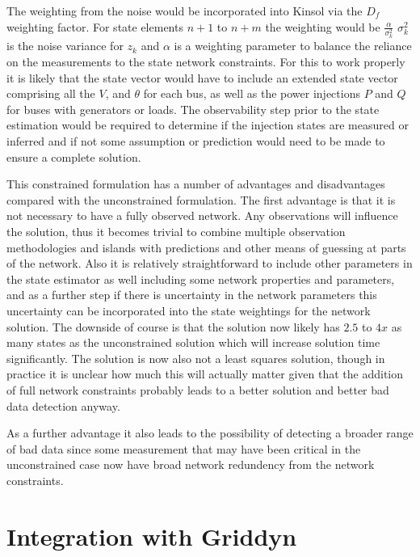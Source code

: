 \documentclass[11pt]{article} %
\begin{document}
The weighting from the noise would be incorporated into Kinsol via the $D_f$ weighting factor.  For state elements $n+1$ to $n+m$ the weighting would be $\frac{\alpha}{\sigma_k^2}$  $\sigma_k^2$ is the noise variance for $z_k$ and $\alpha$ is a weighting parameter to balance the reliance on the measurements to the state network constraints.  For this to work properly it is likely that the state vector would have to include an extended state vector comprising all the $V$, and $\theta$ for each bus,  as well as the power injections $P$ and $Q$ for buses with generators or loads.  The observability step prior to the state estimation would be required to determine if the injection states are measured or inferred and if not some assumption or prediction would need to be made to ensure a complete solution.

This constrained formulation has a number of advantages and disadvantages compared with the unconstrained formulation.  The first advantage is that it is not necessary to have a fully observed network.  Any observations will influence the solution, thus it becomes trivial to combine multiple observation methodologies and islands with predictions and other means of guessing at parts of the network.  Also it is relatively straightforward to include other parameters in the state estimator as well including some network properties and parameters, and as a further step if there is uncertainty in the network parameters this uncertainty can be incorporated into the state weightings for the network solution.  The downside of course is that the solution now likely has $2.5$ to $4x$ as many states as the unconstrained solution which will increase solution time significantly.  The solution is now also not a least squares solution,  though in practice it is unclear how much this will actually matter given that the addition of full network constraints probably leads to a better solution and better bad data detection anyway.

As a further advantage it also leads to the possibility of detecting a broader range of bad data since some measurement that may have been critical in the unconstrained case now have broad network redundency from the network constraints.

\section{Integration with Griddyn}
\end{document}
